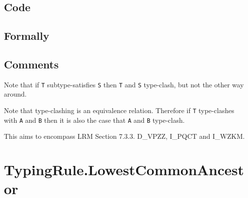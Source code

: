 \documentclass{book}
\begin{document}
  \subsection{Code}

  \subsection{Formally}

  \subsection{Comments}
  Note that if \texttt{T} subtype-satisfies \texttt{S} then \texttt{T} and \texttt{S} type-clash, but not the other
  way around.

  Note that type-clashing is an equivalence relation. Therefore if \texttt{T}
  type-clashes with \texttt{A} and \texttt{B} then it is also the case that \texttt{A} and \texttt{B} type-clash.

  This aims to encompass LRM Section 7.3.3. D\_VPZZ, I\_PQCT and I\_WZKM.

\section{TypingRule.LowestCommonAncestor \label{sec:TypingRule.LowestCommonAncestor}}
\end{document}
